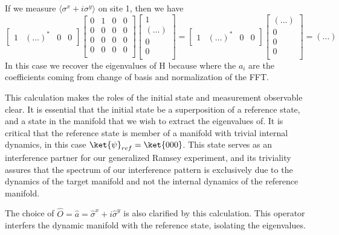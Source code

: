 If we measure $\langle \sigma^x + i \sigma^y \rangle$ on site 1, then we have
\begin{equation}
\begin{bmatrix}
1 & (\ldots)^* & 0 & 0
\end{bmatrix}
\begin{bmatrix}
0 & 1 & 0 & 0 \\
0 & 0 & 0 & 0 \\
0 & 0 & 0 & 0 \\
0 & 0 & 0 & 0 \\
\end{bmatrix}
\begin{bmatrix}
1 \\
(\ldots) \\
0 \\
0 \\
\end{bmatrix}
=
\begin{bmatrix}
1 & (\ldots)^* & 0 & 0
\end{bmatrix}
\begin{bmatrix}
(\ldots) \\
0 \\
0 \\
0 \\
\end{bmatrix}
= (...)
\end{equation}
In this case we recover the eigenvalues of H because 
where the $a_i$ are the coefficients coming from change of basis and normalization of the FFT.

This calculation makes the roles of the initial state and measurement observable clear.
It is essential that the initial state be a superposition of a reference state, and a state in the manifold that we wish to extract the eigenvalues of.
It is critical that the reference state is member of a manifold with trivial internal dynamics, in this case $\ket{\psi}_{ref} = \ket{000}$.
This state serves as an interference partner for our generalized Ramsey experiment,
and its triviality assures that the spectrum of our interference pattern is exclusively due to the dynamics of the target manifold and not the internal dynamics of the reference manifold.

The choice of $\hat{O} = \hat{a} = \hat{\sigma}^x + i \hat{\sigma}^y$ is also clarified by this calculation.
This operator interfers the dynamic manifold with the reference state, isolating the eigenvalues.

